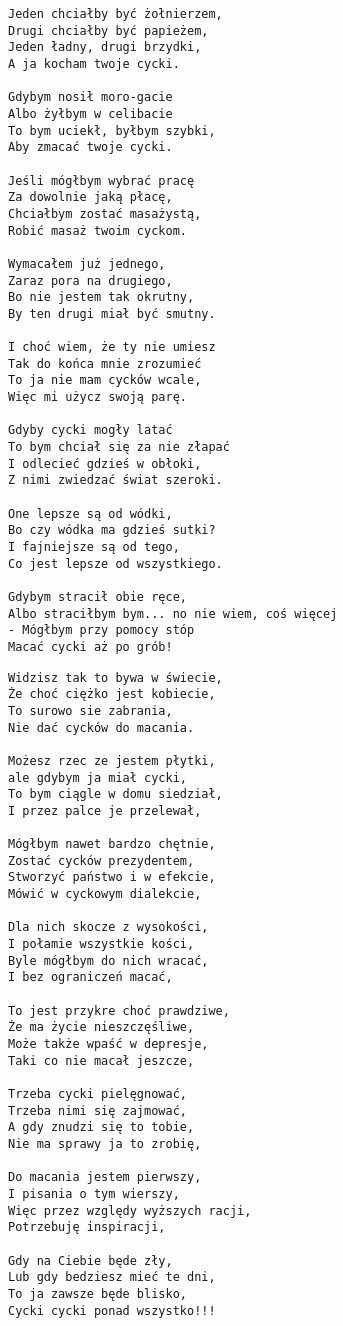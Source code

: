 \documentclass[12pt]{article}
\begin{document}
\begin{verbatim}
Jeden chciałby być żołnierzem,
Drugi chciałby być papieżem,
Jeden ładny, drugi brzydki,
A ja kocham twoje cycki.

Gdybym nosił moro-gacie
Albo żyłbym w celibacie
To bym uciekł, byłbym szybki,
Aby zmacać twoje cycki.

Jeśli mógłbym wybrać pracę
Za dowolnie jaką płacę,
Chciałbym zostać masażystą,
Robić masaż twoim cyckom.

Wymacałem już jednego,
Zaraz pora na drugiego,
Bo nie jestem tak okrutny,
By ten drugi miał być smutny.

I choć wiem, że ty nie umiesz
Tak do końca mnie zrozumieć
To ja nie mam cycków wcale,
Więc mi użycz swoją parę.

Gdyby cycki mogły latać
To bym chciał się za nie złapać
I odlecieć gdzieś w obłoki,
Z nimi zwiedzać świat szeroki.

One lepsze są od wódki,
Bo czy wódka ma gdzieś sutki?
I fajniejsze są od tego,
Co jest lepsze od wszystkiego.

Gdybym stracił obie ręce,
Albo straciłbym bym... no nie wiem, coś więcej
- Mógłbym przy pomocy stóp
Macać cycki aż po grób!
\end{verbatim}
\clearpage

\begin{verbatim}
Widzisz tak to bywa w świecie,
Że choć ciężko jest kobiecie,
To surowo sie zabrania,
Nie dać cycków do macania.

Możesz rzec ze jestem płytki,
ale gdybym ja miał cycki,
To bym ciągle w domu siedział,
I przez palce je przelewał,

Mógłbym nawet bardzo chętnie,
Zostać cycków prezydentem,
Stworzyć państwo i w efekcie,
Mówić w cyckowym dialekcie,

Dla nich skocze z wysokości,
I połamie wszystkie kości,
Byle mógłbym do nich wracać,
I bez ograniczeń macać,

To jest przykre choć prawdziwe,
Że ma życie nieszczęśliwe,
Może także wpaść w depresje,
Taki co nie macał jeszcze,

Trzeba cycki pielęgnować,
Trzeba nimi się zajmować,
A gdy znudzi się to tobie,
Nie ma sprawy ja to zrobię,

Do macania jestem pierwszy,
I pisania o tym wierszy,
Więc przez względy wyższych racji,
Potrzebuję inspiracji,

Gdy na Ciebie będe zły,
Lub gdy bedziesz mieć te dni,
To ja zawsze będe blisko,
Cycki cycki ponad wszystko!!!
\end{verbatim}
\clearpage
\end{document}

